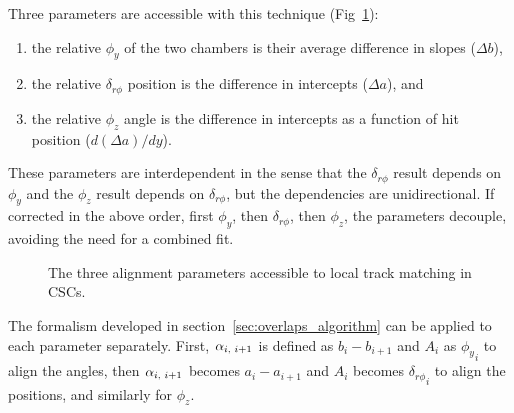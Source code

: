 \documentclass[12pt]{article}
\begin{document}
Three parameters are accessible with this technique (Fig~\ref{fig:overlaps_parameters}):
\begin{enumerate}
\item the relative
$\phi_y$ of the two chambers is their average difference in slopes ($\Delta b$),
\item the relative $\delta_{r\phi}$ position is the difference in intercepts ($\Delta
a$), and
\item the relative $\phi_z$ angle is the difference in intercepts
as a function of hit position ($d(\Delta a)/dy$).  
\end{enumerate}
These parameters are interdependent in the sense that the
$\delta_{r\phi}$ result depends on $\phi_y$ and the $\phi_z$ result
depends on $\delta_{r\phi}$, but the dependencies are unidirectional.
If corrected in the above order, first $\phi_y$, then $\delta_{r\phi}$, then
$\phi_z$, the parameters decouple, avoiding the need for a combined
fit.

\begin{figure}
 \hfill {} \hfill {}
\caption{The three alignment parameters accessible to local track matching in CSCs. \label{fig:overlaps_parameters}}
\end{figure}

The formalism developed in section~\ref{sec:overlaps_algorithm}
can be applied to each parameter separately.  First,
$\alpha_{i\mbox{\scriptsize, }i+1}$ is defined as $b_i - b_{i+1}$ and $A_i$
as ${\phi_y}_i$ to align the angles, then
$\alpha_{i\mbox{\scriptsize, }i+1}$ becomes $a_i - a_{i+1}$ and $A_i$
becomes ${\delta_{r\phi}}_i$ to align the positions, and similarly for
$\phi_z$.
\end{document}
